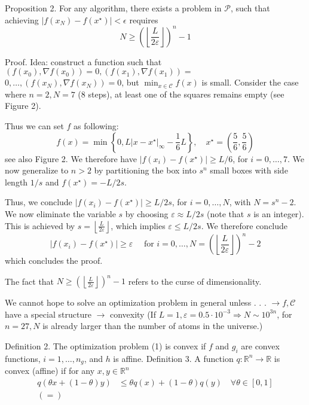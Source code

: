 Proposition 2. For any algorithm, there exists a problem in $\mathcal{P}$, such that achieving $\left|f\left(x_{N}\right)-f\left(x^{\star}\right)\right|<\epsilon$ requires
$$
	N \geq\left(\left\lfloor\frac{L}{2 \varepsilon}\right\rfloor\right)^{n}-1
$$

Proof. Idea: construct a function such that $\left(f\left(x_{0}\right), \nabla f\left(x_{0}\right)\right)=0,\left(f\left(x_{1}\right), \nabla f\left(x_{1}\right)\right)=$ $0, \ldots,\left(f\left(x_{N}\right), \nabla f\left(x_{N}\right)\right)=0$, but $\min _{x \in \mathcal{C}} f(x)$ is small.
Consider the case where $n=2, N=7$ (8 steps), at least one of the squares remains empty (see Figure 2).

Thus we can set $f$ as following:
$$
	f(x)=\min \left\{0, L\left|x-x^{\star}\right|_{\infty}-\frac{1}{6} L\right\}, \quad x^{\star}=\left(\frac{5}{6}, \frac{5}{6}\right)
$$
see also Figure 2.
We therefore have $\left|f\left(x_{i}\right)-f\left(x^{\star}\right)\right| \geqslant L / 6$, for $i=0, \ldots, 7$.
We now generalize to $n>2$ by partitioning the box into $s^{n}$ small boxes with side length $1 / s$ and $f\left(x^{\star}\right)=-L / 2 s$.

Thus, we conclude $\left|f\left(x_{i}\right)-f\left(x^{\star}\right)\right| \geqslant L / 2 s$, for $i=0, \ldots, N$, with $N=s^{n}-2$.
We now eliminate the variable $s$ by choosing $\varepsilon \approx L / 2 s$ (note that $s$ is an integer). This is achieved by $s=\left\lfloor\frac{L}{2 \varepsilon}\right\rfloor$, which implies $\varepsilon \leqslant L / 2 s$.
We therefore conclude
$$
	\left|f\left(x_{i}\right)-f\left(x^{\star}\right)\right| \geqslant \varepsilon \quad \text { for } i=0, \ldots, N=\left(\left\lfloor\frac{L}{2 \varepsilon}\right\rfloor\right)^{n}-2
$$
which concludes the proof.

The fact that $N \geq\left(\left\lfloor\frac{L}{2 \varepsilon}\right\rfloor\right)^{n}-1$ refers to the curse of dimensionality.

We cannot hope to solve an optimization problem in general unless . . .
$\rightarrow f, \mathcal{C}$ have a special structure
$\rightarrow$ convexity
(If $L=1, \varepsilon=0.5 \cdot 10^{-3} \Rightarrow N \sim 10^{3 n}$, for $n=27, N$ is already larger than the number of atoms in the universe.)

Definition 2. The optimization problem (1) is convex if $f$ and $g_{i}$ are convex functions, $i=1, \ldots, n_{g}$, and $h$ is affine.
Definition 3. A function $q: \mathbb{R}^{n} \rightarrow \mathbb{R}$ is convex (affine) if for any $x, y \in \mathbb{R}^{n}$
$$
	\begin{aligned}
		q(\theta x+(1-\theta) y) & \leq \theta q(x)+(1-\theta) q(y) \quad \forall \theta \in[0,1] \\
		(=)                      &
	\end{aligned}
$$

